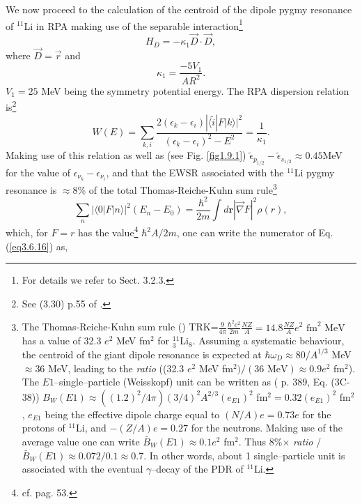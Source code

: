 We now proceed to the calculation of the centroid of the dipole pygmy resonance of $^{11}$Li in  RPA making use of the separable interaction\footnote{For details we refer to \cite{Bortignon:98} Sect. 3.2.3.}
 \begin{equation}\label{eq2.F.6}
H_D=-\kappa_1\vec D\cdot\vec D,
 \end{equation}
where $\vec D=\vec r$ and
 \begin{equation}
\kappa_1=\frac{-5V_1}{AR^2}.
 \end{equation}
  $V_1=25$ MeV being the symmetry potential energy.
The  RPA dispersion relation is\footnote{See (3.30) p.55 of \cite{Bortignon:98}.}
\begin{equation}\label{eq3.6.16}
W(E)=\sum_{k,i}\frac{2(\epsilon_k-\epsilon_i)|\langle \tilde i|F|k\rangle|^2}{(\epsilon_k-\epsilon_i)^2-E^2}=\frac{1}{\kappa_1}.
\end{equation}
 Making use of this relation as well as (see Fig. \ref{fig1.9.1}) $\tilde\epsilon_{p_{1/2}}-\tilde\epsilon_{s_{1/2}}\approx 0.45 $MeV for the value of 
 $\epsilon_{\nu_k}-\epsilon_{\nu_i}$, and that the EWSR associated with the $^{11}$Li pygmy resonance is $\approx 8$\% of the total Thomas-Reiche-Kuhn sum rule\footnote{\label{f73C3} The Thomas-Reiche-Kuhn sum rule (\cite{Bohr:75,Bortignon:98}) TRK=$\frac{9}{4\pi} \frac{\hbar^2e^2}{2m} \frac{NZ}{A}=14.8 \frac{NZ}{A} e^2\text{ fm}^2 \text{ MeV}$ has a value of 32.3 $e^2$ MeV fm$^2$ for $^{11}_3$Li$_8$. Assuming a systematic behaviour, the centroid of the giant dipole resonance is expected at $\hbar\omega_D\approx80/A^{1/3}$ MeV $\approx 36$ MeV, leading to the \textit{ratio} (\equiv(32.3 $e^2$ MeV fm$^2)/(36\text{ MeV})\approx 0.9 e^2$ fm$^2$). The $E1$--single--particle (Weisskopf) unit can be written as (\cite{Bohr:69} p. 389, Eq. (3C-38)) $B_W(E1)\approx ((1.2)^2/4\pi) (3/4)^2 A^{2/3} (e_{E1})^2$ fm$^2=0.32 (e_{E1})^2$ fm$^2$, $e_{E1}$ being the effective dipole charge equal to $(N/A)e=0.73 e$ for the protons of $^{11}$Li, and $-(Z/A)e=0.27$ for the neutrons. Making use of the average value one can write $\bar B_W(E1)\approx0.1 e^2$ fm$^2$. Thus 8\%$\times$ \textit{ratio} /$\bar B_W(E1)\approx 0.072/0.1\approx 0.7$. In other words, about 1 single--particle unit is associated with the eventual $\gamma$--decay of the PDR of $^{11}$Li.}
 \begin{equation}
\sum_n |\langle0|F|n\rangle|^2(E_n-E_0)=\frac{\hbar^2}{2m}\int d\mathbf r |\vec\nabla F|^2 \rho(r),
 \end{equation}
 which, for $F=r$ has the value\footnote{cf. \cite{Bertsch:05} pag. 53.} $\hbar^2 A/2m$, one can write the numerator of Eq. (\ref{eq3.6.16}) as, 

